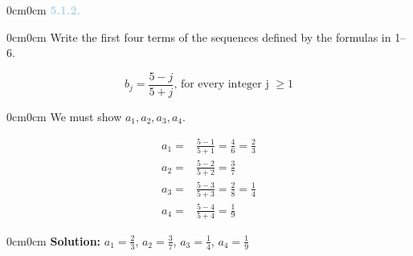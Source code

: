 \documentclass{article}
\begin{document}
	\vspace{0cm}
		\begin{adjustwidth}{0cm}{0cm}
			\textcolor{lightblue}{\textbf{5.1.2.}}
		\end{adjustwidth}
	\vspace{0cm}
	\vspace{0.5cm}
		\begin{adjustwidth}{0cm}{0cm}
			Write the first four terms of the sequences defined by the
			formulas in 1–6.

			\[
				b_j = \frac{5 - j}{5 + j}\text{, for every integer j } \geq 1
			\]
		\end{adjustwidth}
	\vspace{0.25cm}
	\vspace{0.25cm}
		\begin{adjustwidth}{0cm}{0cm}
			We must show \(a_1, a_2, a_3, a_4\).

			\[
				\begin{aligned}
					a_1 = & \frac{5 - 1}{5 + 1} = \frac{4}{6} = \boxed{\frac{2}{3}} \\
					a_2 = & \frac{5 - 2}{5 + 2} = \boxed{\frac{3}{7}} \\
					a_3 = & \frac{5 - 3}{5 + 3} = \frac{2}{8} = \boxed{\frac{1}{4}} \\
					a_4 = & \frac{5 - 4}{5 + 4} = \boxed{\frac{1}{9}}
				\end{aligned}
			\]
		\end{adjustwidth}
	\vspace{0.25cm}
	\vspace{0.25cm}
		\begin{adjustwidth}{0cm}{0cm}
			\textbf{Solution:} \(a_1 = \frac{2}{3}\), \(a_2 = \frac{3}{7}\),
			\(a_3 = \frac{1}{4}\), \(a_4 = \frac{1}{9}\)
		\end{adjustwidth}
	\vspace{0.25cm}
\end{document}
